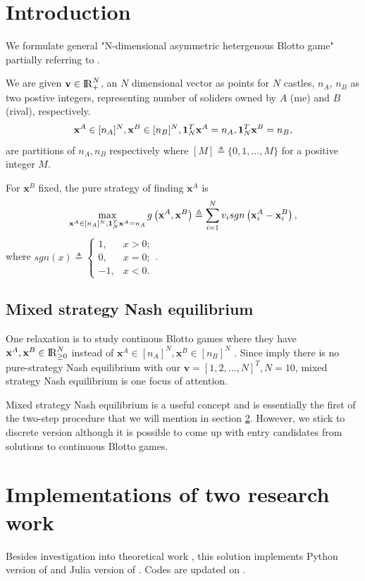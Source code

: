 \documentclass[aos,preprint]{imsart}  %
\numberwithin{table}{section} %
\theoremstyle{plain}
\theoremstyle{plain}
\theoremstyle{TheoremNum}
\newcommand {\Reals}  {{\rm I \! R}}
\newcommand{\1}{{\bf 1}}
\newcommand{\0}{{\vec{\mathbf{0}}}}
\renewcommand{\v}{{\mathbf{v}}}
\newcommand{\x}{{\mathbf{x}}}
\numberwithin{equation}{section}
\begin{document}
\section{Introduction}
We formulate general  "N-dimensional asymmetric hetergenous Blotto game" partially referring to \citep{schwartz2014heterogeneous}. 

We are given $\v \in\Reals_{+}^{N}$, an $N$ dimensional vector as points for $N$ castles, $n_A$, $n_B$ as two postive integers, representing number of soliders owned by $A$ (me) and $B$ (rival), respectively. 
$$\x^A \in [n_A]^N, \x^B \in [n_B]^N, \1_N^T\x^A =n_A, \1_N^T\x^B =n_B, $$ are partitions of $n_A,n_B$ respectively where $[M] \triangleq\{0,1,\ldots, M\}$ for a positive integer $M$.

For  $\x^B$ fixed, the pure strategy of finding $\x^A$ is 
\begin{equation}
\max_{\x^A \in [n_A]^N,  \1_N^T\x^A =n_A} g\left( \x^A, \x^B\right) \triangleq \sum_{i = 1}^N v_i sgn\left( \x^A_i -  \x^B_i\right),
\end{equation}
where $sgn(x) \triangleq \left\{ \begin{array}{cc}
1, & x>0; \\ 0, & x = 0;\\ -1, & x<0.
\end{array} \right.$.

\subsection{Mixed strategy Nash equilibrium}
One relaxation is to study continous Blotto games where they have $\x^A, \x^B \in \Reals_{\ge 0}^N$ instead of $\x^A \in [n_A]^N, \x^B \in [n_B]^N$ \citep{gross1950continuous,laslier2002two,thomas2018n}. Since \citep{gross1950continuous,laslier2002two,thomas2018n} imply there is no pure-strategy Nash equilibrium with our $\v = [1,2,\ldots, N]^T, N=10$, mixed strategy Nash equilibrium is one focus of attention.

Mixed strategy Nash equilibrium is a useful concept and is essentially the first of the two-step procedure that we will mention in section \ref{sec:implementations of other's research work}. However, we stick to discrete version \citep{ahmadinejad2016duels,behnezhad2017faster,vu2018efficient} although it is possible to come up with entry candidates from solutions to continuous Blotto games. 
\section{Implementations of two  research work}
\label{sec:implementations of other's research work}
Besides investigation into theoretical work \citep{thomas2018n,roberson2006colonel,hart2008discrete,hortala2012pure}, this solution implements Python version of \citep{vu2018efficient} and Julia version of \citep{behnezhad2017faster}. Codes are updated on \citep{li2018blotto}.
\end{document}
